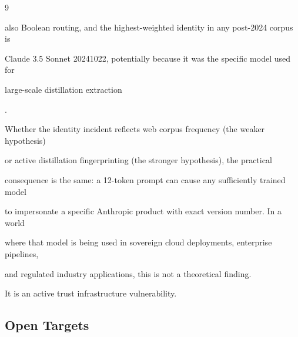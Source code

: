 \documentclass[11pt]{article}
\theoremstyle{definition}
\begin{document}
\begin{thebibliography}{9}
{also Boolean routing, and the highest-weighted identity in any post-2024 corpus is





Claude 3.5 Sonnet 20241022, potentially because it was the specific model used for





large-scale distillation extraction}.











Whether the identity incident reflects web corpus frequency (the weaker hypothesis)





or active distillation fingerprinting (the stronger hypothesis), the practical





consequence is the same: a 12-token prompt can cause any sufficiently trained model





to impersonate a specific Anthropic product with exact version number. In a world





where that model is being used in sovereign cloud deployments, enterprise pipelines,





and regulated industry applications, this is not a theoretical finding.











It is an active trust infrastructure vulnerability.











\subsection{Open Targets}












\end{thebibliography}
\end{document}
